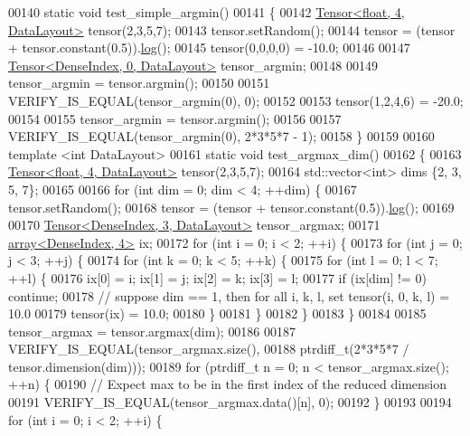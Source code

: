 \begin{DoxyCode}
00140 \textcolor{keyword}{static} \textcolor{keywordtype}{void} test\_simple\_argmin()
00141 \{
00142   \hyperlink{class_eigen_1_1_tensor}{Tensor<float, 4, DataLayout>} tensor(2,3,5,7);
00143   tensor.setRandom();
00144   tensor = (tensor + tensor.constant(0.5)).\hyperlink{structlog}{log}();
00145   tensor(0,0,0,0) = -10.0;
00146 
00147   \hyperlink{class_eigen_1_1_tensor}{Tensor<DenseIndex, 0, DataLayout>} tensor\_argmin;
00148 
00149   tensor\_argmin = tensor.argmin();
00150 
00151   VERIFY\_IS\_EQUAL(tensor\_argmin(0), 0);
00152 
00153   tensor(1,2,4,6) = -20.0;
00154 
00155   tensor\_argmin = tensor.argmin();
00156 
00157   VERIFY\_IS\_EQUAL(tensor\_argmin(0), 2*3*5*7 - 1);
00158 \}
00159 
00160 \textcolor{keyword}{template} <\textcolor{keywordtype}{int} DataLayout>
00161 \textcolor{keyword}{static} \textcolor{keywordtype}{void} test\_argmax\_dim()
00162 \{
00163   \hyperlink{class_eigen_1_1_tensor}{Tensor<float, 4, DataLayout>} tensor(2,3,5,7);
00164   std::vector<int> dims \{2, 3, 5, 7\};
00165 
00166   \textcolor{keywordflow}{for} (\textcolor{keywordtype}{int} dim = 0; dim < 4; ++dim) \{
00167     tensor.setRandom();
00168     tensor = (tensor + tensor.constant(0.5)).\hyperlink{structlog}{log}();
00169 
00170     \hyperlink{class_eigen_1_1_tensor}{Tensor<DenseIndex, 3, DataLayout>} tensor\_argmax;
00171     \hyperlink{class_eigen_1_1array}{array<DenseIndex, 4>} ix;
00172     \textcolor{keywordflow}{for} (\textcolor{keywordtype}{int} i = 0; i < 2; ++i) \{
00173       \textcolor{keywordflow}{for} (\textcolor{keywordtype}{int} j = 0; j < 3; ++j) \{
00174         \textcolor{keywordflow}{for} (\textcolor{keywordtype}{int} k = 0; k < 5; ++k) \{
00175           \textcolor{keywordflow}{for} (\textcolor{keywordtype}{int} l = 0; l < 7; ++l) \{
00176             ix[0] = i; ix[1] = j; ix[2] = k; ix[3] = l;
00177             \textcolor{keywordflow}{if} (ix[dim] != 0) \textcolor{keywordflow}{continue};
00178             \textcolor{comment}{// suppose dim == 1, then for all i, k, l, set tensor(i, 0, k, l) = 10.0}
00179             tensor(ix) = 10.0;
00180           \}
00181         \}
00182       \}
00183     \}
00184 
00185     tensor\_argmax = tensor.argmax(dim);
00186 
00187     VERIFY\_IS\_EQUAL(tensor\_argmax.size(),
00188                     ptrdiff\_t(2*3*5*7 / tensor.dimension(dim)));
00189     \textcolor{keywordflow}{for} (ptrdiff\_t n = 0; n < tensor\_argmax.size(); ++n) \{
00190       \textcolor{comment}{// Expect max to be in the first index of the reduced dimension}
00191       VERIFY\_IS\_EQUAL(tensor\_argmax.data()[n], 0);
00192     \}
00193 
00194     \textcolor{keywordflow}{for} (\textcolor{keywordtype}{int} i = 0; i < 2; ++i) \{

\end{DoxyCode}
